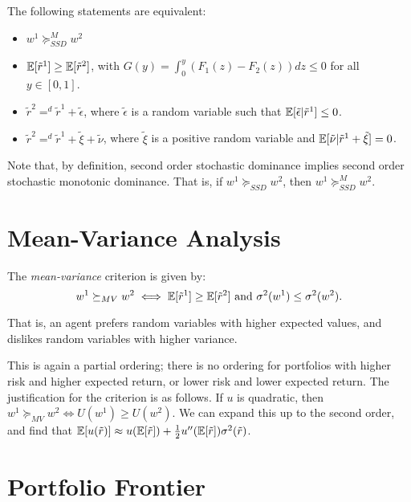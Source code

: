 \documentclass[twoside]{article}
\begin{document}
\begin{proposition}
    The following statements are equivalent:
    \begin{itemize}
        \item $w^1 \succeq_{SSD}^M w^2$
        \item $\mathbb{E}[\tilde{r}^1] \geq \mathbb{E}[\tilde{r}^2]$, with $G(y) = \int_0^y\left(F_1(z) - F_2(z)\right) dz \leq 0$ for all $y \in [0, 1]$.
        \item $\tilde{r}^2 =^d \tilde{r}^1 + \tilde{\epsilon}$, where $\tilde{\epsilon}$ is a random variable such that $\mathbb{E}[\tilde{\epsilon} | \tilde{r}^1] \leq 0$.
        \item $\tilde{r}^2 =^d \tilde{r}^1 + \tilde{\xi} + \tilde{\nu}$, where $\tilde{\xi}$ is a positive random variable and $\mathbb{E}[\tilde{\nu} | \tilde{r}^1 + \tilde{\xi}] = 0$.
    \end{itemize}
\end{proposition}

Note that, by definition, second order stochastic dominance implies second order stochastic monotonic dominance. That is, if $w^1 \succeq_{SSD} w^2$, then $w^1 \succeq_{SSD}^M w^2$.

\section{Mean-Variance Analysis}

The \textit{mean-variance} criterion is given by:
\[
    w^1 \succeq_{MV} w^2 \iff \mathbb{E}[\tilde{r}^1] \geq \mathbb{E}[\tilde{r}^2] \text{ and } \sigma^2(w^1) \leq \sigma^2(w^2).
\]
\begin{explanation}
    That is, an agent prefers random variables with higher expected values, and dislikes random variables with higher variance.
\end{explanation}
This is again a partial ordering; there is no ordering for portfolios with higher risk and higher expected return, or lower risk and lower expected return. The justification for the criterion is as follows. If $u$ is quadratic, then $w^1 \succeq_{MV} w^2 \iff U(w^1) \geq U(w^2)$. We can expand this up to the second order, and find that $\mathbb{E}[u(\tilde{r})] \approx u(\mathbb{E}[\tilde{r}]) + \frac{1}{2}u''(\mathbb{E}[\tilde{r}])\sigma^2(\tilde{r})$.


\section{Portfolio Frontier}
\end{document}
